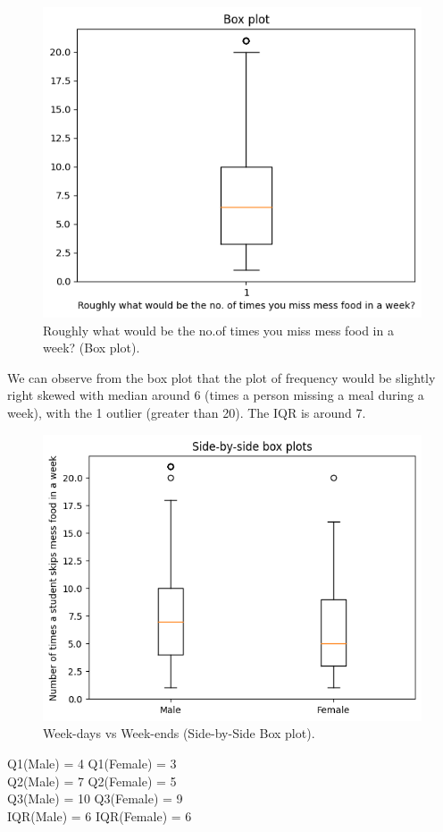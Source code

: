 \documentclass{article}
\begin{document}
\begin{figure}[H]
    \centering
    \includegraphics[scale = 1]{box_skipfrequency.png}
    \caption{Roughly what would be the no.of times you miss mess food in a week? (Box plot).}  
    \label{fig:boxplot}
\end{figure}
We can observe from the box plot that the plot of frequency would be slightly right skewed with median
around 6 (times a person missing a meal during a week), with the 1 outlier (greater than 20). The IQR is around
7.
\begin{figure}[H]
    \centering
    \includegraphics[scale = 0.8]{side-by-side-gender-skip-relation.png}
    \caption{Week-days vs Week-ends (Side-by-Side Box plot).}  
    \label{fig:side-by-side}
\end{figure}
\begin{center}
    Q1(Male) = 4 \quad  Q1(Female) = 3\\
    Q2(Male) = 7 \quad Q2(Female) = 5\\
    Q3(Male) = 10 \quad Q3(Female) = 9 \\
    IQR(Male) = 6 \quad IQR(Female) = 6  
\end{center}
\end{document}
